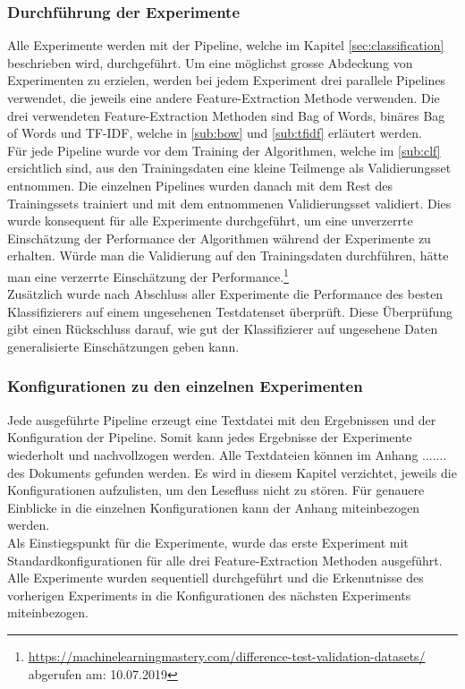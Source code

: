 \subsubsection{Durchführung der Experimente}
Alle Experimente werden mit der Pipeline, welche im Kapitel \cref{sec:classification} beschrieben wird, durchgeführt.
Um eine möglichst grosse Abdeckung von Experimenten zu erzielen, werden bei jedem Experiment drei parallele Pipelines verwendet, die jeweils eine andere Feature-Extraction Methode verwenden.
Die drei verwendeten Feature-Extraction Methoden sind \glqq Bag of Words\grqq{}, \glqq binäres Bag of Words\grqq{} und \glqq TF-IDF\grqq{}, welche in \cref{sub:bow} und \cref{sub:tfidf} erläutert werden.\\
Für jede Pipeline wurde vor dem Training der Algorithmen, welche im \cref{sub:clf} ersichtlich sind, aus den Trainingsdaten eine kleine Teilmenge als Validierungsset entnommen.
Die einzelnen Pipelines wurden danach mit dem Rest des Trainingssets trainiert und mit dem entnommenen Validierungsset validiert.
Dies wurde konsequent für alle Experimente durchgeführt, um eine unverzerrte Einschätzung der Performance der Algorithmen während der Experimente zu erhalten.
Würde man die Validierung auf den Trainingsdaten durchführen, hätte man eine verzerrte Einschätzung der Performance.\footnote{\url{https://machinelearningmastery.com/difference-test-validation-datasets/} abgerufen am: 10.07.2019}\\
Zusätzlich wurde nach Abschluss aller Experimente die Performance des besten Klassifizierers auf einem ungesehenen Testdatenset überprüft.
Diese Überprüfung gibt einen Rückschluss darauf, wie gut der Klassifizierer auf ungesehene Daten generalisierte Einschätzungen geben kann.
\subsubsection{Konfigurationen zu den einzelnen Experimenten}
Jede ausgeführte Pipeline erzeugt eine Textdatei mit den Ergebnissen und der Konfiguration der Pipeline.
Somit kann jedes Ergebnisse der Experimente wiederholt und nachvollzogen werden.
Alle Textdateien können im Anhang ....... des Dokuments gefunden werden.
Es wird in diesem Kapitel verzichtet, jeweils die Konfigurationen aufzulisten, um den Lesefluss nicht zu stören.
Für genauere Einblicke in die einzelnen Konfigurationen kann der Anhang miteinbezogen werden.\\
Als Einstiegspunkt für die Experimente, wurde das erste Experiment mit Standardkonfigurationen für alle drei Feature-Extraction Methoden ausgeführt.\\
Alle Experimente wurden sequentiell durchgeführt und die Erkenntnisse des vorherigen Experiments in die Konfigurationen des nächsten Experiments miteinbezogen.

